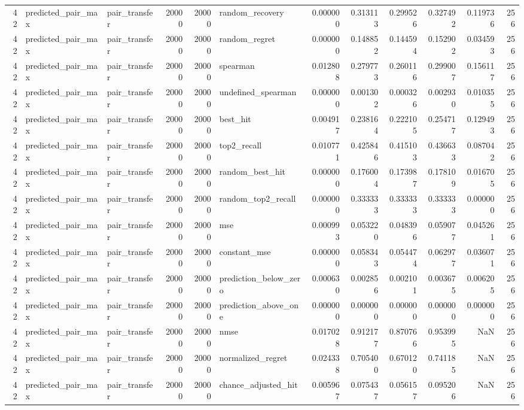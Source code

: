 \begin{tabular}{rllrrlrrrrrr}
42 & predicted_pair_max & pair_transfer & 20000 & 20000 & random_recovery & 0.000000 & 0.313113 & 0.299526 & 0.327492 & 0.119736 & 256 \\
42 & predicted_pair_max & pair_transfer & 20000 & 20000 & random_regret & 0.000000 & 0.148852 & 0.144594 & 0.152902 & 0.034593 & 256 \\
42 & predicted_pair_max & pair_transfer & 20000 & 20000 & spearman & 0.012808 & 0.279773 & 0.260116 & 0.299007 & 0.156117 & 256 \\
42 & predicted_pair_max & pair_transfer & 20000 & 20000 & undefined_spearman & 0.000000 & 0.001302 & 0.000326 & 0.002930 & 0.010355 & 256 \\
42 & predicted_pair_max & pair_transfer & 20000 & 20000 & best_hit & 0.004917 & 0.238164 & 0.222105 & 0.254717 & 0.129493 & 256 \\
42 & predicted_pair_max & pair_transfer & 20000 & 20000 & top2_recall & 0.010771 & 0.425846 & 0.415103 & 0.436633 & 0.087042 & 256 \\
42 & predicted_pair_max & pair_transfer & 20000 & 20000 & random_best_hit & 0.000000 & 0.176004 & 0.173987 & 0.178109 & 0.016705 & 256 \\
42 & predicted_pair_max & pair_transfer & 20000 & 20000 & random_top2_recall & 0.000000 & 0.333333 & 0.333333 & 0.333333 & 0.000000 & 256 \\
42 & predicted_pair_max & pair_transfer & 20000 & 20000 & mse & 0.000993 & 0.053220 & 0.048396 & 0.059077 & 0.045261 & 256 \\
42 & predicted_pair_max & pair_transfer & 20000 & 20000 & constant_mse & 0.000000 & 0.058343 & 0.054474 & 0.062977 & 0.036071 & 256 \\
42 & predicted_pair_max & pair_transfer & 20000 & 20000 & prediction_below_zero & 0.000630 & 0.002856 & 0.002101 & 0.003675 & 0.006205 & 256 \\
42 & predicted_pair_max & pair_transfer & 20000 & 20000 & prediction_above_one & 0.000000 & 0.000000 & 0.000000 & 0.000000 & 0.000000 & 256 \\
42 & predicted_pair_max & pair_transfer & 20000 & 20000 & nmse & 0.017028 & 0.912177 & 0.870766 & 0.953995 & NaN & 256 \\
42 & predicted_pair_max & pair_transfer & 20000 & 20000 & normalized_regret & 0.024338 & 0.705400 & 0.670120 & 0.741185 & NaN & 256 \\
42 & predicted_pair_max & pair_transfer & 20000 & 20000 & chance_adjusted_hit & 0.005967 & 0.075437 & 0.056157 & 0.095206 & NaN & 256 \\

\end{tabular}
